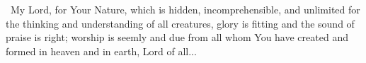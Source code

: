 \documentclass[12pt,twoside,a5paper]{article}
\begin{document}
\cc~My Lord, for Your Nature, which is hidden, incomprehensible, and unlimited for the thinking and understanding of all creatures, glory is fitting and the sound of praise is right; worship is seemly and due from all whom You have created and formed in heaven and in earth, Lord of all...






\end{document}
